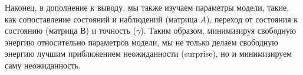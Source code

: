 \documentclass[12pt]{article}
\begin{document}

\begin{figure}[h]
\end{figure}

Наконец, в дополнение к выводу, мы также изучаем параметры модели, такие, как сопоставление состояний и наблюдений (матрица $A$), переход от состояния к состоянию (матрица $В$) и точность ($\gamma$). Таким образом, минимизируя свободную энергию относительно параметров модели, мы не только делаем свободную энергию лучшим приближением неожиданности (surprise), но и минимизируем саму неожиданность.

\begin{figure}[h]
\end{figure}
\end{document}
